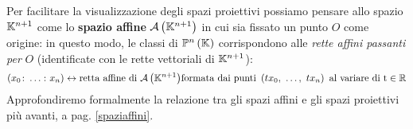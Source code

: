 \begin{intuit}
	Per facilitare la visualizzazione degli spazi proiettivi possiamo pensare allo spazio $\mathbb{K}^{n+1}$ come lo \textbf{spazio affine} ${\mathcal{A}\left(\mathbb{K}^{n+1}\right)}$ in cui sia fissato un punto $O$ come origine: in questo modo, le classi di $\proj[n]{\kamp}$ corrispondono alle \textit{rette affini passanti per} $O$ (identificate con le rette vettoriali di $\mathbb{K}^{n+1}$):
	\begin{equation*}
		\left(x_0\colon\ldots\colon x_n\right)\leftrightarrow\text{retta affine di }\aff{\kamp^{n+1}}\text{formata dai punti }\left(tx_0,\ \ldots,\ tx_n\right)\text{ al variare di t}\in\realset
	\end{equation*}
	Approfondiremo formalmente la relazione tra gli spazi affini e gli spazi proiettivi più avanti, a pag. \ref{spaziaffini}.
\end{intuit}
